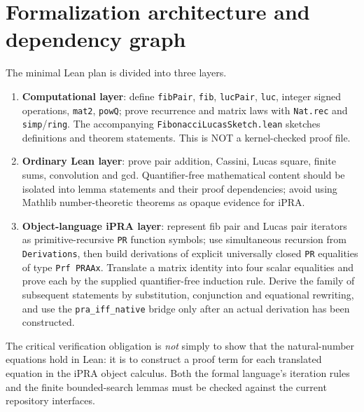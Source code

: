 \documentclass[11pt]{article}
\begin{document}
\section{Formalization architecture and dependency graph}
The minimal Lean plan is divided into three layers.
\begin{enumerate}
\item \textbf{Computational layer}: define \texttt{fibPair}, \texttt{fib}, \texttt{lucPair}, \texttt{luc}, integer signed operations, \texttt{mat2}, \texttt{powQ}; prove recurrence and matrix laws with \texttt{Nat.rec} and \texttt{simp}/\texttt{ring}. The accompanying \texttt{FibonacciLucasSketch.lean} sketches definitions and theorem statements. This is NOT a kernel-checked proof file.
\item \textbf{Ordinary Lean layer}: prove pair addition, Cassini, Lucas square, finite sums, convolution and gcd. Quantifier-free mathematical content should be isolated into lemma statements and their proof dependencies; avoid using Mathlib number-theoretic theorems as opaque evidence for iPRA.
\item \textbf{Object-language iPRA layer}: represent fib pair and Lucas pair iterators as primitive-recursive \texttt{PR} function symbols; use simultaneous recursion from \texttt{Derivations}, then build derivations of explicit universally closed \texttt{PR} equalities of type \texttt{Prf PRAAx}. Translate a matrix identity into four scalar equalities and prove each by the supplied quantifier-free induction rule. Derive the family of subsequent statements by substitution, conjunction and equational rewriting, and use the \texttt{pra\_iff\_native} bridge only after an actual derivation has been constructed.
\end{enumerate}
The critical verification obligation is \emph{not} simply to show that the natural-number equations hold in Lean: it is to construct a proof term for each translated equation in the iPRA object calculus. Both the formal language's iteration rules and the finite bounded-search lemmas must be checked against the current repository interfaces.
\end{document}
